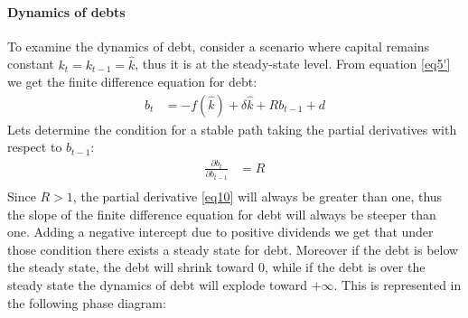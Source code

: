 \documentclass[12pt]{article}
\begin{document}
\paragraph{Dynamics of debts}
To examine the dynamics of debt, consider a scenario where capital remains constant \(k_t=k_{t-1}=\widehat{k}\), thus it is at the
steady-state level. From equation \ref{eq5'} we get the finite difference equation for debt:
\begin{align*}
    b_{t} &=  - f(\widehat{k}) + \delta \widehat{k} + R  b_{t-1} + d  \tag{10} \label{eq10}
\end{align*}
Lets determine the condition for a stable path taking the partial derivatives with respect to \(b_{t-1}\):
\begin{align*}
    \frac{\partial{b_t}}{\partial b_{t-1}} &= R \tag{11} \label{eq11} \\
\end{align*}
Since \(R >1\), the partial derivative \ref{eq10} will always be greater than one, thus the slope of the finite
difference equation for debt will always be steeper than one. Adding a negative intercept due to positive dividends we
get that under those condition there exists a steady state for debt. Moreover if the debt is below the steady state, the
debt will shrink toward 0, while if the debt is over the steady state the dynamics of debt will explode toward
\(+\infty\). This is represented in the following phase diagram:
\end{document}
